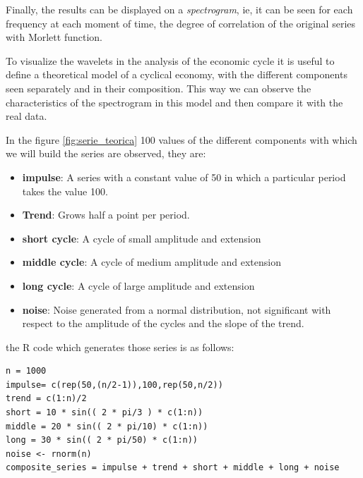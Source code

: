 \documentclass[a4paper]{article}
\begin{document}
Finally, the results can be displayed on a \textit{spectrogram}, ie, it can be seen for each frequency at each moment of time, the degree of correlation of the original series with Morlett function.


To visualize the wavelets in the analysis of the economic cycle it is useful to define a theoretical model of a cyclical economy, with the different components seen separately and in their composition. This way we can observe the characteristics of the spectrogram in this model and then compare it with the real data.

In the figure \ref{fig:serie_teorica} 100 values of the different components with which we will build the series are observed, they are:


\begin{itemize}
	
	\item \textbf{impulse}: A series with a constant value of 50 in which a particular period takes the value 100.
	\item \textbf{Trend}: Grows half a point per period.
	\item \textbf{short cycle}: A cycle of small amplitude and extension
	\item \textbf{middle cycle}: A cycle of medium amplitude and extension
	\item \textbf{long cycle}: A cycle of large amplitude and extension
	\item \textbf{noise}: Noise generated from a normal distribution, not significant with respect to the amplitude of the cycles and the slope of the trend.
\end{itemize}

the R code which generates those series is as follows:

\begin{lstlisting}
n = 1000
impulse= c(rep(50,(n/2-1)),100,rep(50,n/2))
trend = c(1:n)/2
short = 10 * sin(( 2 * pi/3 ) * c(1:n))
middle = 20 * sin(( 2 * pi/10) * c(1:n))
long = 30 * sin(( 2 * pi/50) * c(1:n))
noise <- rnorm(n)
composite_series = impulse + trend + short + middle + long + noise
\end{lstlisting}


\end{document}
